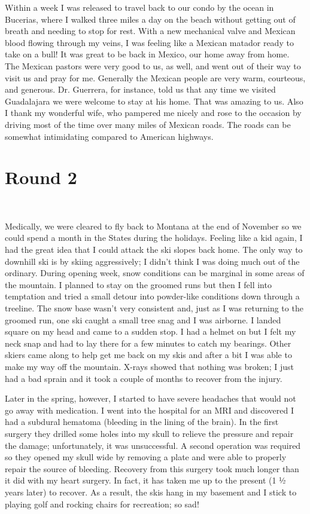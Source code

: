\documentclass[oneside]{book}
\begin{document}
Within a week I was released to travel back to our condo by the ocean in Bucerias, where I walked three miles a day on the beach without getting out of breath and needing to stop for rest. With a new mechanical valve and Mexican blood flowing through my veins, I was feeling like a Mexican matador ready to take on a bull! It was great to be back in Mexico, our home away from home. The Mexican pastors were very good to us, as well, and went out of their way to visit us and pray for me. Generally the Mexican people are very warm, courteous, and generous. Dr. Guerrera, for instance, told us that any time we visited Guadalajara we were welcome to stay at his home. That was amazing to us. Also I thank my wonderful wife, who pampered me nicely and rose to the occasion by driving most of the time over many miles of Mexican roads. The roads can be somewhat intimidating compared to American highways. 


\section{Round 2}
\

Medically, we were cleared to fly back to Montana at the end of November so we could spend a month in the States during the holidays. Feeling like a kid again, I had the great idea that I could attack the ski slopes back home. The only way to downhill ski is by skiing aggressively; I didn’t think I was doing much out of the ordinary. During opening week, snow conditions can be marginal in some areas of the mountain. I planned to stay on the groomed runs but then I fell into temptation and tried a small detour into powder-like conditions down through a treeline. The snow base wasn’t very consistent and, just as I was returning to the groomed run, one ski caught a small tree snag and I was airborne. I landed square on my head and came to a sudden stop. I had a helmet on but I felt my neck snap and had to lay there for a few minutes to catch my bearings. Other skiers came along to help get me back on my skis and after a bit I was able to make my way off the mountain. X-rays showed that nothing was broken; I just had a bad sprain and it took a couple of months to recover from the injury. 

Later in the spring, however, I started to have severe headaches that would not go away with medication. I went into the hospital for an MRI and discovered I had a subdural hematoma (bleeding in the lining of the brain). In the first surgery they drilled some holes into my skull to relieve the pressure and repair the damage; unfortunately, it was unsuccessful. A second operation was required so they opened my skull wide by removing a plate and were able to properly repair the source of bleeding. Recovery from this surgery took much longer than it did with my heart surgery. In fact, it has taken me up to the present (1 ½ years later) to recover. As a result, the skis hang in my basement and I stick to playing golf and rocking chairs for recreation; so sad!
\end{document}
